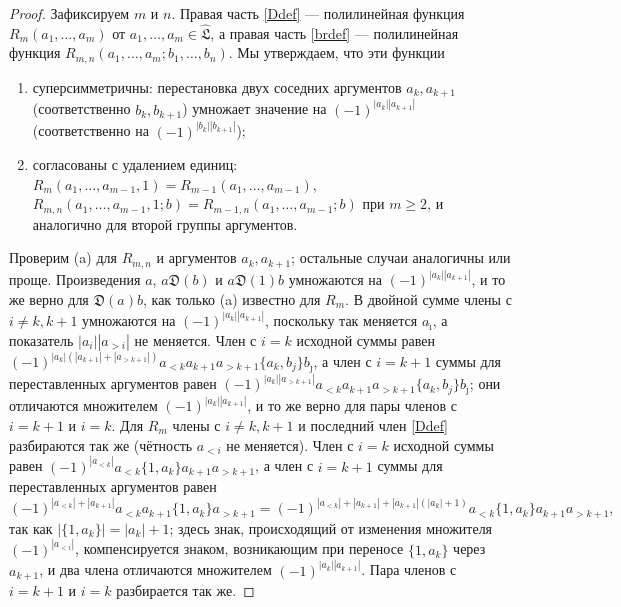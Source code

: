 \documentclass[11pt,reqno]{amsart}
\newcommand{\LL}{\mathfrak L}
\newcommand{\D}{\mathfrak D}
\newcommand{\Lh}{\widehat{\LL}}
\theoremstyle{plain}
\theoremstyle{definition}
\theoremstyle{remark}
\begin{document}
\begin{proof}
Зафиксируем $m$ и $n$.
Правая часть \eqref{Ddef} --- полилинейная функция $R_m(a_1,\dots,a_m)$ от $a_1,\dots,a_m\in\Lh$, а правая часть \eqref{brdef} --- полилинейная функция $R_{m,n}(a_1,\dots,a_m;b_1,\dots,b_n)$.
Мы утверждаем, что эти функции
\begin{enumerate}
\item[(a)] суперсимметричны: перестановка двух соседних аргументов $a_k,a_{k+1}$ (соответственно $b_k,b_{k+1}$) умножает значение на $(-1)^{|a_k||a_{k+1}|}$ (соответственно на $(-1)^{|b_k||b_{k+1}|}$);
\item[(b)] согласованы с удалением единиц: $R_m(a_1,\dots,a_{m-1},1)=R_{m-1}(a_1,\dots,a_{m-1})$, $R_{m,n}(a_1,\dots,a_{m-1},1;b)=R_{m-1,n}(a_1,\dots,a_{m-1};b)$ при $m\ge2$, и аналогично для второй группы аргументов.
\end{enumerate}
Проверим (a) для $R_{m,n}$ и аргументов $a_k,a_{k+1}$; остальные случаи аналогичны или проще.
Произведения $a$, $a\D(b)$ и $a\D(1)b$ умножаются на $(-1)^{|a_k||a_{k+1}|}$, и то же верно для $\D(a)b$, как только (a) известно для $R_m$.
В двойной сумме члены с $i\ne k,k+1$ умножаются на $(-1)^{|a_k||a_{k+1}|}$, поскольку так меняется $a_{\hat\imath}$, а показатель $|a_i||a_{>i}|$ не меняется.
Член с $i=k$ исходной суммы равен $(-1)^{|a_k|(|a_{k+1}|+|a_{>k+1}|)}a_{<k}a_{k+1}a_{>k+1}\{a_k,b_j\}b_{\hat\jmath}$, а член с $i=k+1$ суммы для переставленных аргументов равен $(-1)^{|a_k||a_{>k+1}|}a_{<k}a_{k+1}a_{>k+1}\{a_k,b_j\}b_{\hat\jmath}$; они отличаются множителем $(-1)^{|a_k||a_{k+1}|}$, и то же верно для пары членов с $i=k+1$ и $i=k$.
Для $R_m$ члены с $i\ne k,k+1$ и последний член \eqref{Ddef} разбираются так же (чётность $a_{<i}$ не меняется).
Член с $i=k$ исходной суммы равен $(-1)^{|a_{<k}|}a_{<k}\{1,a_k\}a_{k+1}a_{>k+1}$, а член с $i=k+1$ суммы для переставленных аргументов равен
$$
(-1)^{|a_{<k}|+|a_{k+1}|}a_{<k}a_{k+1}\{1,a_k\}a_{>k+1}=(-1)^{|a_{<k}|+|a_{k+1}|+|a_{k+1}|(|a_k|+1)}a_{<k}\{1,a_k\}a_{k+1}a_{>k+1},
$$
так как $|\{1,a_k\}|=|a_k|+1$; здесь знак, происходящий от изменения множителя $(-1)^{|a_{<i}|}$, компенсируется знаком, возникающим при переносе $\{1,a_k\}$ через $a_{k+1}$, и два члена отличаются множителем $(-1)^{|a_k||a_{k+1}|}$.
Пара членов с $i=k+1$ и $i=k$ разбирается так же.


\end{proof}
\end{document}
